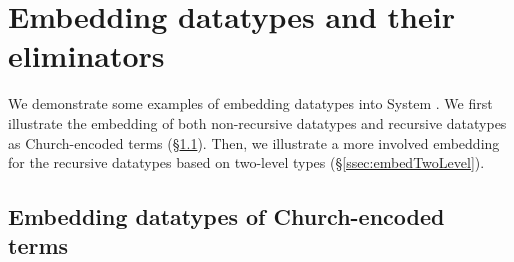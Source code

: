 \section{Embedding datatypes and their eliminators} \label{sec:data}
We demonstrate some examples of embedding datatypes into System \Fi.
We first illustrate the embedding of both non-recursive datatypes and
recursive datatypes as Church-encoded terms (\S\ref{ssec:embedChurch}).
Then, we illustrate a more involved embedding for the recursive datatypes
based on two-level types (\S\ref{ssec:embedTwoLevel}).

\subsection{Embedding datatypes of Church-encoded terms}
\label{ssec:embedChurch}


